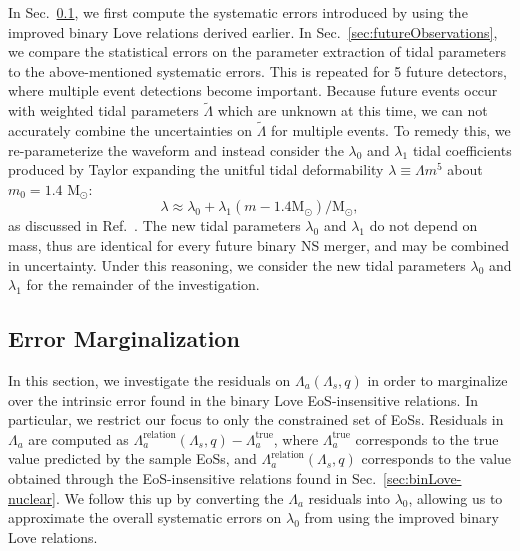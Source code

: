 \documentclass[prd,twocolumn,nofootinbib,superscriptaddress,amsmath,amssymb]{revtex4-1}
\begin{document}
In Sec.~\ref{sec:marginalization}, we first compute the systematic errors introduced by using the improved binary Love relations derived earlier.
In Sec.~\ref{sec:futureObservations}, we compare the statistical errors on the parameter extraction of tidal parameters to the above-mentioned systematic errors.
This is repeated for 5 future detectors, where multiple event detections become important.
Because future events occur with weighted tidal parameters $\tilde\Lambda$ which are unknown at this time, we can not accurately combine the uncertainties on $\tilde\Lambda$ for multiple events.
To remedy this, we re-parameterize the waveform and instead consider the $\lambda_0$ and $\lambda_1$ tidal coefficients produced by Taylor expanding the unitful tidal deformability $\lambda \equiv \Lambda m^5$ about $m_0=1.4\text{ M}_{\odot}$:
\begin{equation}
\lambda \approx \lambda_0 + \lambda_1 (m-1.4 \text{M}_{\odot})/\text{M}_{\odot},
\end{equation}
as discussed in Ref.~\cite{delPozzo:TaylorTidal}.
The new tidal parameters $\lambda_0$ and $\lambda_1$ do not depend on mass, thus are identical for every future binary NS merger, and may be combined in uncertainty.
Under this reasoning, we consider the new tidal parameters $\lambda_0$ and $\lambda_1$ for the remainder of the investigation.

\subsection{Error Marginalization}\label{sec:marginalization}

In this section, we investigate the residuals on $\Lambda_a(\Lambda_s,q)$ in order to marginalize over the intrinsic error found in the binary Love EoS-insensitive relations.
In particular, we restrict our focus to only the constrained set of EoSs.
Residuals in $\Lambda_a$ are computed as $\Lambda_a^{\text{relation}}(\Lambda_s,q)-\Lambda_a^{\text{true}}$, where $\Lambda_a^{\text{true}}$ corresponds to the true value predicted by the sample EoSs, and $\Lambda_a^{\text{relation}}(\Lambda_s,q)$ corresponds to the value obtained through the EoS-insensitive relations found in Sec.~\ref{sec:binLove-nuclear}.
We follow this up by converting the $\Lambda_a$ residuals into $\lambda_0$, allowing us to approximate the overall systematic errors on $\lambda_0$ from using the improved binary Love relations.
\end{document}
